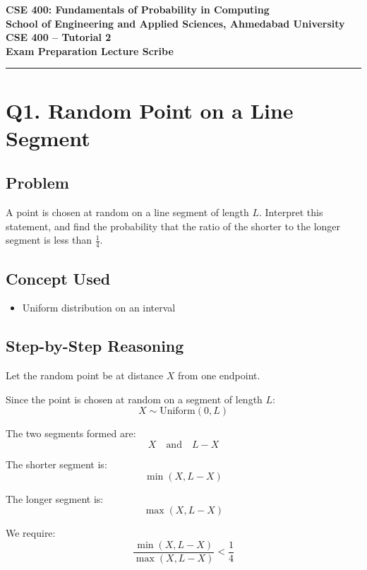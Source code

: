 \documentclass[11pt]{article}
\begin{document}
\begin{center}
\textbf{\Large CSE 400: Fundamentals of Probability in Computing} \\[4pt]
\textbf{School of Engineering and Applied Sciences, Ahmedabad University} \\[8pt]
\textbf{\Large CSE 400 – Tutorial 2} \\[4pt]
\textbf{Exam Preparation Lecture Scribe}
\end{center}

\hrule
\vspace{0.5cm}

\section*{Q1. Random Point on a Line Segment}

\subsection*{Problem}

A point is chosen at random on a line segment of length $L$. Interpret this statement, and find the probability that the ratio of the shorter to the longer segment is less than $\frac{1}{4}$.

\subsection*{Concept Used}

\begin{itemize}
\item Uniform distribution on an interval
\end{itemize}

\subsection*{Step-by-Step Reasoning}

Let the random point be at distance $X$ from one endpoint.

Since the point is chosen at random on a segment of length $L$:
\[
X \sim \text{Uniform}(0, L)
\]

The two segments formed are:
\[
X \quad \text{and} \quad L - X
\]

The shorter segment is:
\[
\min(X, L-X)
\]

The longer segment is:
\[
\max(X, L-X)
\]

We require:
\[
\frac{\min(X, L-X)}{\max(X, L-X)} < \frac{1}{4}
\]
\end{document}
